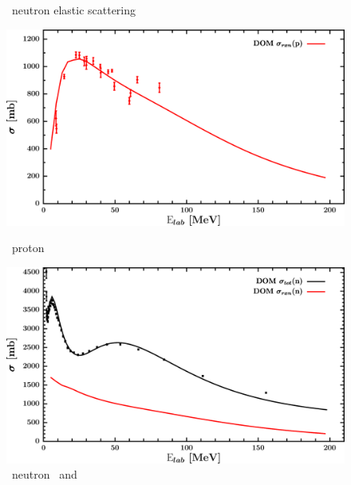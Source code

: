 \begin{figure}[hbtp]
\begin{minipage}{0.47\textwidth}
        \caption*{\niEight\ neutron elastic scattering}
        \label{DOMFitData_ni58_neutron_elastic}
    \end{minipage}
\end{figure}
\vspace{0.70in}
\begin{figure}[hbtp]
    \centering
    \begin{minipage}{0.47\textwidth}
        \centering
        \includegraphics[width=\linewidth]{figures/ni58_protonInelastic.png}
        \caption*{\niEight\ proton \rxn}
        \label{DOMFitData_ni58_proton_inelastic}
    \end{minipage}\hspace{6pt}
    \begin{minipage}{0.47\textwidth}
        \centering
        \includegraphics[width=\textwidth]{figures/ni58_neutronInelastic.png}
        \caption*{\niEight\ neutron \rxn\ and \tot}
        \label{DOMFitData_ni58_neutron_inelastic}
    \end{minipage}
\end{figure}
\afterpage{\clearpage}
